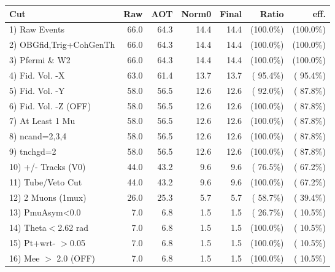  \begin{table}[h!]\centering
 \begin{tabular}{||l||r|r|r|r|r|r||}
 \hline
 \hline
 Cut & Raw & AOT & Norm0 & Final & Ratio & eff.       \\
 \hline
  1) Raw Events           &         66.0 &         64.3 &         14.4 &         14.4 & (100.0\%) & (100.0\%) \\
  2) OBGfid,Trig+CohGenTh &         66.0 &         64.3 &         14.4 &         14.4 & (100.0\%) & (100.0\%) \\
  3) Pfermi \& W2         &         66.0 &         64.3 &         14.4 &         14.4 & (100.0\%) & (100.0\%) \\
  4) Fid. Vol. -X         &         63.0 &         61.4 &         13.7 &         13.7 & ( 95.4\%) & ( 95.4\%) \\
  5) Fid. Vol. -Y         &         58.0 &         56.5 &         12.6 &         12.6 & ( 92.0\%) & ( 87.8\%) \\
  6) Fid. Vol. -Z (OFF)   &         58.0 &         56.5 &         12.6 &         12.6 & (100.0\%) & ( 87.8\%) \\
  7) At Least 1 Mu        &         58.0 &         56.5 &         12.6 &         12.6 & (100.0\%) & ( 87.8\%) \\
  8) ncand=2,3,4          &         58.0 &         56.5 &         12.6 &         12.6 & (100.0\%) & ( 87.8\%) \\
  9) tnchgd=2             &         58.0 &         56.5 &         12.6 &         12.6 & (100.0\%) & ( 87.8\%) \\
 10) +/- Tracks (V0)      &         44.0 &         43.2 &          9.6 &          9.6 & ( 76.5\%) & ( 67.2\%) \\
 11) Tube/Veto Cut        &         44.0 &         43.2 &          9.6 &          9.6 & (100.0\%) & ( 67.2\%) \\
 12) 2 Muons (1mux)       &         26.0 &         25.3 &          5.7 &          5.7 & ( 58.7\%) & ( 39.4\%) \\
 13) PmuAsym<0.0          &          7.0 &          6.8 &          1.5 &          1.5 & ( 26.7\%) & ( 10.5\%) \\
 14) Theta$<$2.62 rad     &          7.0 &          6.8 &          1.5 &          1.5 & (100.0\%) & ( 10.5\%) \\
 15) Pt+wrt- $>$0.05      &          7.0 &          6.8 &          1.5 &          1.5 & (100.0\%) & ( 10.5\%) \\
 16) Mee $>$ 2.0  (OFF)   &          7.0 &          6.8 &          1.5 &          1.5 & (100.0\%) & ( 10.5\%) \\

\end{tabular}
\end{table}

